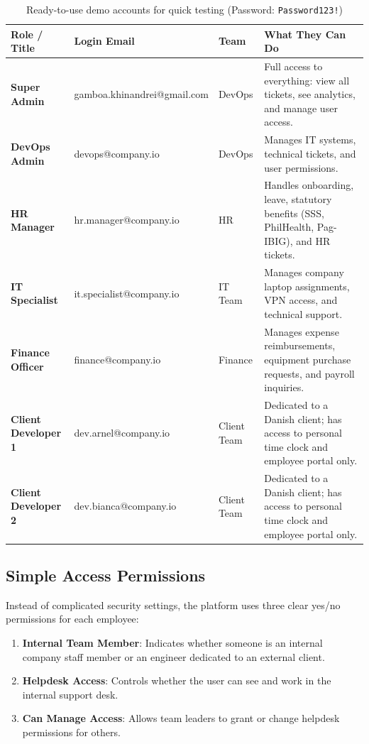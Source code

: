 \documentclass[a4paper,11pt]{article}
\begin{document}
\begin{table}[!ht]
\centering
\small
\begin{tabularx}{\textwidth}{>{\raggedright\arraybackslash\bfseries}p{2.5cm} >{\raggedright\arraybackslash\footnotesize\ttfamily}p{4.7cm} >{\raggedright\arraybackslash}p{2.0cm} X}
\toprule
\textbf{Role / Title} & \textbf{Login Email} & \textbf{Team} & \textbf{What They Can Do} \\
\midrule
Super Admin & gamboa.khinandrei@gmail.com & DevOps & Full access to everything: view all tickets, see analytics, and manage user access. \\
\addlinespace
DevOps Admin & devops@company.io & DevOps & Manages IT systems, technical tickets, and user permissions. \\
\addlinespace
HR Manager & hr.manager@company.io & HR & Handles onboarding, leave, statutory benefits (SSS, PhilHealth, Pag-IBIG), and HR tickets. \\
\addlinespace
IT Specialist & it.specialist@company.io & IT Team & Manages company laptop assignments, VPN access, and technical support. \\
\addlinespace
Finance Officer & finance@company.io & Finance & Manages expense reimbursements, equipment purchase requests, and payroll inquiries. \\
\addlinespace
Client Developer 1 & dev.arnel@company.io & Client Team & Dedicated to a Danish client; has access to personal time clock and employee portal only. \\
\addlinespace
Client Developer 2 & dev.bianca@company.io & Client Team & Dedicated to a Danish client; has access to personal time clock and employee portal only. \\
\bottomrule
\end{tabularx}
\caption{Ready-to-use demo accounts for quick testing (Password: \texttt{Password123!})}
\end{table}

\subsection{Simple Access Permissions}
Instead of complicated security settings, the platform uses three clear yes/no permissions for each employee:
\begin{enumerate}
    \item \textbf{Internal Team Member}: Indicates whether someone is an internal company staff member or an engineer dedicated to an external client.
    \item \textbf{Helpdesk Access}: Controls whether the user can see and work in the internal support desk.
    \item \textbf{Can Manage Access}: Allows team leaders to grant or change helpdesk permissions for others.
\end{enumerate}
\end{document}
